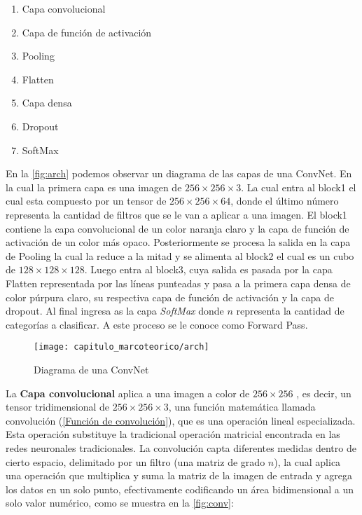 \begin{enumerate}
    \item{Capa convolucional}
    \item{Capa de función de activación}
    \item{Pooling}
    \item{Flatten}
    \item{Capa densa}
    \item{Dropout}
    \item{SoftMax}
\end{enumerate}

En la \autoref{fig:arch} podemos observar un diagrama de las capas de una
ConvNet. En la cual la primera capa es una imagen de  \(256 \times 256 \times
3\). La cual entra al block1 el cual esta compuesto por un tensor de \(256
\times 256 \times 64\), donde el último número representa la cantidad de filtros
que se le van a aplicar a una imagen. El block1 contiene la capa convolucional
de un color naranja claro y la capa de función de activación de un color más
opaco. Posteriormente se procesa la salida en la capa de Pooling la cual la
reduce a la mitad y se alimenta al block2 el cual es un cubo de \(128 \times
128 \times 128\). Luego entra al block3, cuya salida es pasada por la capa
Flatten representada por las líneas punteadas y pasa a la primera capa densa de
color púrpura claro, su respectiva capa de función de activación y la capa de
dropout. Al final ingresa as la capa \emph{SoftMax} donde \(n\) representa la
cantidad de categorías a clasificar. A este proceso se le conoce como Forward
Pass.

\begin{figure}[H]
    \centering
    \texttt{[image: capitulo\_marcoteorico/arch]}
    \caption{Diagrama de una ConvNet}\label{fig:arch}
\end{figure}

La \textbf{Capa convolucional} aplica a una imagen a color de  \(256 \times 256\) ,
es decir, un tensor tridimensional de  \(256 \times 256 \times 3\), una función
matemática llamada convolución (\autoref{Función de convolución}), que es una
operación lineal especializada. Esta operación substituye la tradicional
operación matricial encontrada en las redes neuronales tradicionales. La
convolución capta diferentes medidas dentro de cierto espacio, delimitado por un
filtro (una matriz de grado \(n\)), la cual aplica una operación que multiplica y
suma la matriz de la imagen de entrada y agrega los datos en un solo punto,
efectivamente codificando un área bidimensional a un solo valor numérico, como
se muestra en la \autoref{fig:conv}:

